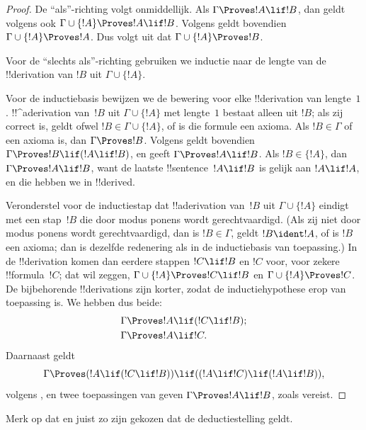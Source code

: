 \documentclass[../../../include/open-logic-section]{subfiles}
\begin{document}
\begin{proof}
De ``als''-richting volgt onmiddellijk. Als $\Gamma \Proves !A \lif
!B$, dan geldt volgens  ook $\Gamma \cup
\{!A\} \Proves !A \lif !B$. Volgens
 geldt bovendien $\Gamma \cup \{!A\}
\Proves !A$. Dus volgt uit  dat $\Gamma \cup
\{!A\} \Proves !B$.

Voor de ``slechts als''-richting gebruiken we inductie naar de lengte
van de !!{derivation} van $!B$ uit $\Gamma \cup \{!A\}$.

Voor de inductiebasis bewijzen we de bewering voor elke
!!{derivation} van lengte~$1$. !!^a{derivation} van~$!B$ uit $\Gamma
\cup \{!A\}$ met lengte~$1$ bestaat alleen uit $!B$; als zij correct
is, geldt ofwel $!B$$\in \Gamma \cup \{!A\}$, of is die formule een
axioma. Als $!B \in \Gamma$ of een axioma is, dan $\Gamma \Proves !B$.
Volgens  geldt bovendien $\Gamma \Proves !B \lif
(!A \lif !B)$, en  geeft $\Gamma \Proves !A \lif !B$.
Als $!B \in \{ !A\}$, dan $\Gamma \Proves !A \lif !B$, want de laatste
!!{sentence}~$!A \lif !B$ is gelijk aan $!A \lif !A$, en die hebben we
in  !!{derive}d.

Veronderstel voor de inductiestap dat !!a{derivation} van~$!B$ uit
$\Gamma \cup \{!A\}$ eindigt met een stap~$!B$ die door modus ponens
wordt gerechtvaardigd. (Als zij niet door modus ponens wordt
gerechtvaardigd, dan is $!B \in \Gamma$, geldt $!B \ident !A$, of is
$!B$ een axioma; dan is dezelfde redenering als in de inductiebasis
van toepassing.) In de !!{derivation} komen dan eerdere stappen
$!C \lif !B$ en $!C$ voor, voor zekere !!{formula}~$!C$; dat wil zeggen,
$\Gamma \cup \{!A\} \Proves !C \lif !B$ en $\Gamma \cup \{!A\}
\Proves !C$. De bijbehorende !!{derivation}s zijn korter, zodat de
inductiehypothese erop van toepassing is. We hebben dus beide:
\begin{align*}
  & \Gamma \Proves !A \lif (!C \lif !B); \\
  & \Gamma \Proves !A \lif !C.
\end{align*}
Daarnaast geldt
\[
\Gamma \Proves (!A \lif (!C \lif !B)) \lif
((!A\lif !C)  \lif (!A \lif !B)),
\]
volgens , en twee toepassingen van
 geven $\Gamma \Proves !A \lif !B$, zoals vereist.
\end{proof}

Merk op dat  en  juist zo zijn
gekozen dat de deductiestelling geldt.
\end{document}
